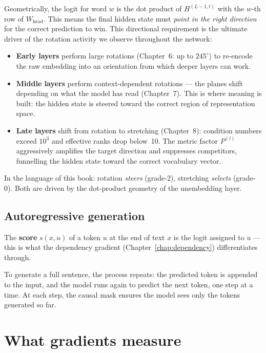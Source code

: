 \documentclass[11pt, twoside, openright]{memoir}
\begin{document}
Geometrically, the logit for word $w$ is the dot product of
$H^{(L-1,t)}$ with the $w$-th row of $W_{\mathrm{head}}$.  This means
the final hidden state must \emph{point in the right direction} for the
correct prediction to win.  This directional requirement is the
ultimate driver of the rotation activity we observe throughout the
network:

\begin{itemize}[nosep]
\item \textbf{Early layers} perform large rotations (Chapter~6: up to
  $245^\circ$) to re-encode the raw embedding into an orientation from
  which deeper layers can work.
\item \textbf{Middle layers} perform context-dependent rotations --- the
  planes shift depending on what the model has read (Chapter~7).  This
  is where meaning is built: the hidden state is steered toward the
  correct region of representation space.
\item \textbf{Late layers} shift from rotation to stretching
  (Chapter~8): condition numbers exceed $10^3$ and effective ranks drop
  below~10.  The metric factor $P^{(l)}$ aggressively amplifies the
  target direction and suppresses competitors, funnelling the hidden
  state toward the correct vocabulary vector.
\end{itemize}

In the language of this book: rotation \emph{steers} (grade-2),
stretching \emph{selects} (grade-0).  Both are driven by the
dot-product geometry of the unembedding layer.

\subsection*{Autoregressive generation}

The \textbf{score} $s(x, u)$ of a token $u$ at the end of text $x$ is
the logit assigned to $u$ --- this is what the dependency gradient
(Chapter~\ref{chap:dependency}) differentiates through.

To generate a full sentence, the process repeats: the predicted token
is appended to the input, and the model runs again to predict the next
token, one step at a time.  At each step, the causal mask ensures the
model sees only the tokens generated so far.

\section{What gradients measure}
\end{document}
